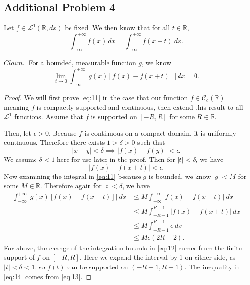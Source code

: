 \documentclass[12pt]{article}
\newcommand{\R}{\mathbb{R}}
\newcommand{\eq}[1]{\begin{equation*}#1\end{equation*}}
\newcommand{\qeq}[1]{\begin{equation}#1\end{equation}}
\newcommand{\qal}[1]{\begin{align}#1\end{align}}
\begin{document}
\subsection*{Additional Problem 4}

Let $f \in \mathcal{L}^1(\R, dx)$ be fixed. We then know that for all $t \in \R$,
\eq{\int_{-\infty}^{+\infty} f(x) ~dx = \int_{-\infty}^{+\infty} f(x+t) ~dx.}

$Claim.~$ For a bounded, measurable function $g$, we know
\qeq{\lim_{t \to 0} \int_{-\infty}^{+\infty}|g(x) [f(x) - f(x+t)]| ~dx = 0. \label{eq:11}}

\begin{proof}
    We will first prove \eqref{eq:11} in the case that our function $f \in \mathcal{C}_c (\R)$ meaning $f$ is compactly supported and continuous, then extend this result to all $\mathcal{L}^1$ functions. Assume that $f$ is supported on $[-R, R]$ for some $R \in \R$.

    Then, let $\epsilon > 0$. Because $f$ is continuous on a compact domain, it is uniformly continuous. Therefore there exists $1 >\delta > 0$ such that
    \eq{|x - y| < \delta \implies |f(x) - f(y)| < \epsilon.}
    We assume $\delta < 1$ here for use later in the proof. Then for $|t| < \delta$, we have
    \qeq{|f(x) - f(x + t)| < \epsilon. \label{eq:13}}
    Now examining the integral in \eqref{eq:11} because $g$ is bounded, we know $|g| < M$ for some $M \in \R$. Therefore again for $|t| < \delta$, we have
    \qal{\int_{-\infty}^{+\infty} |g(x) [f(x) - f(x - t) ]| ~dx &\leq M \int_{-\infty}^{+\infty} |f(x) - f(x+t)| ~dx \nonumber \\
    &\leq M \int_{-R - 1}^{R + 1} |f(x) - f(x + t)| ~dx \label{eq:12}\\
    &\leq M \int_{-R - 1}^{R + 1} \epsilon ~dx \label{eq:14} \\
    &\leq M \epsilon (2R + 2). \nonumber}
    For above, the change of the integration bounds in \eqref{eq:12} comes from the finite support of $f$ on $[-R, R]$. Here we expand the interval by 1 on either side, as $|t| < \delta < 1$, so $f(t)$ can be supported on $(-R - 1, R + 1)$. The inequality in \eqref{eq:14} comes from \eqref{eq:13}.


\end{proof}
\end{document}
